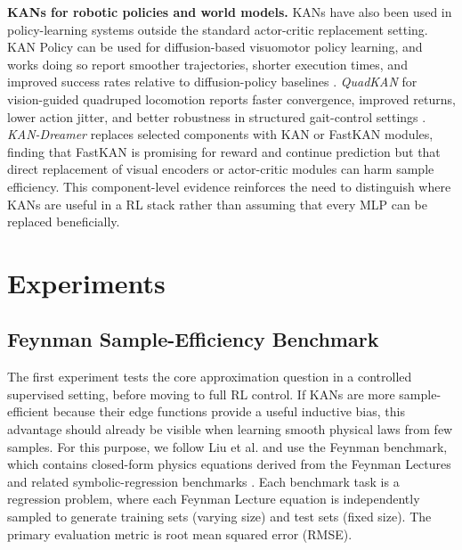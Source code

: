 \documentclass{article}
\begin{document}
\textbf{KANs for robotic policies and world models.}
KANs have also been used in policy-learning systems outside the standard actor-critic replacement setting.
KAN Policy can be used for diffusion-based visuomotor policy learning, and works doing so report smoother trajectories, shorter execution times, and improved success rates relative to diffusion-policy baselines \cite{chen2025kanpolicy}.
\textit{QuadKAN} for vision-guided quadruped locomotion reports faster convergence, improved returns, lower action jitter, and better robustness in structured gait-control settings \cite{wang2025quadkan}.
\textit{KAN-Dreamer} \cite{shi2025kandreamer} replaces selected components with KAN or FastKAN \cite{li2024kolmogorovarnold} modules, finding that FastKAN is promising for reward and continue prediction but that direct replacement of visual encoders or actor-critic modules can harm sample efficiency.
This component-level evidence reinforces the need to distinguish where KANs are useful in a RL stack rather than assuming that every MLP can be replaced beneficially.




\section{Experiments}

\subsection{Feynman Sample-Efficiency Benchmark}
The first experiment tests the core approximation question in a controlled supervised setting, before moving to full RL control.
If KANs are more sample-efficient because their edge functions provide a useful inductive bias, this advantage should already be visible when learning smooth physical laws from few samples.
For this purpose, we follow Liu et al. and use the Feynman benchmark, which contains closed-form physics equations derived from the Feynman Lectures and related symbolic-regression benchmarks \cite{liu2024kan,udrescu2020aifeynman,udrescu2020aifeynman2}.
Each benchmark task is a regression problem, where each Feynman Lecture equation is independently sampled to generate training sets (varying size) and test sets (fixed size).
The primary evaluation metric is root mean squared error (RMSE).
\end{document}
